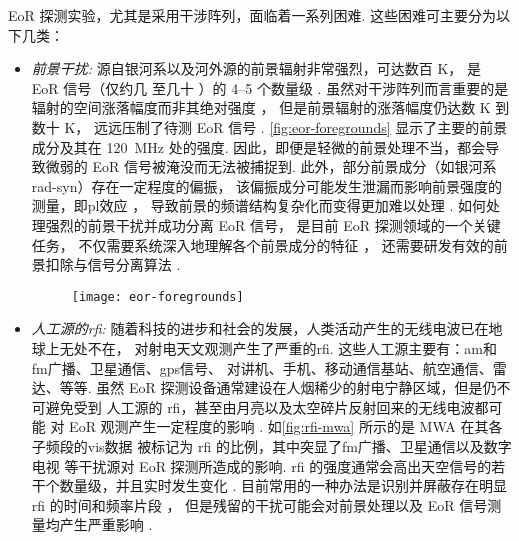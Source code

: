EoR 探测实验，尤其是采用干涉阵列，面临着一系列困难.
这些困难可主要分为以下几类：
\begin{itemize}
\item
\emph{前景干扰:}
源自银河系以及河外源的前景辐射非常强烈，可达数百 \si{\kelvin}，
是 EoR 信号（仅约几 \si{\mK} 至几十 \si{\mK}）的 \numrange{4}{5} 个数量级
\cite{morales2010}.
虽然对干涉阵列而言重要的是辐射的空间涨落幅度而非其绝对强度 \cite{braun1985}，
但是前景辐射的涨落幅度仍达数 \si{\kelvin} 到数十 \si{\kelvin}，
远远压制了待测 EoR 信号 \cite{zaroubi2013}.
\autoref{fig:eor-foregrounds} 显示了主要的前景成分及其在
\SI{120}{\MHz} 处的强度.
因此，即便是轻微的前景处理不当，都会导致微弱的 EoR 信号被淹没而无法被捕捉到.
此外，部分前景成分（如银河系\ac{rad-syn}）存在一定程度的偏振，
该偏振成分可能发生泄漏而影响前景强度的测量，即\ac{pl}效应 \cite{cotton1999}，
导致前景的频谱结构复杂化而变得更加难以处理
\cite{jelic2014,asad2015,asad2016,asad2018,gehlot2018}.
如何处理强烈的前景干扰并成功分离 EoR 信号，
是目前 EoR 探测领域的一个关键任务，
不仅需要系统深入地理解各个前景成分的特征
\cite{jelic2008,jelic2010,wang2010,liu2012,offringa2016,
  carroll2016,murray2017,procopio2017,spinelli2018}，
还需要研发有效的前景扣除与信号分离算法
\cite{wang2006,jelic2008,harker2009,liu2009fgrm,chapman2012,chapman2013,
  gu2013,wang2013,bonaldi2015,chapman2015,chapman2016,mertens2018}.

\begin{figure}[htp]
  \centering
  \texttt{[image: eor-foregrounds]}
  \label{fig:eor-foregrounds}
\end{figure}

\item
\emph{人工源的\acl{rfi}:}
随着科技的进步和社会的发展，人类活动产生的无线电波已在地球上无处不在，
对射电天文观测产生了严重的\acf{rfi}.
这些人工源主要有：\ac{am}和\ac{fm}广播、卫星通信、\ac{gps}信号、
对讲机、手机、移动通信基站、航空通信、雷达、等等.
虽然 EoR 探测设备通常建设在人烟稀少的射电宁静区域，但是仍不可避免受到
人工源的 \ac{rfi}，甚至由月亮以及太空碎片反射回来的无线电波都可能
对 EoR 观测产生一定程度的影响 \cite{mcKinley2013,tingay2013rfi}.
如\autoref{fig:rfi-mwa} 所示的是 MWA 在其各子频段的\ac{vis}数据
被标记为 \ac{rfi} 的比例，其中突显了\ac{fm}广播、卫星通信以及数字电视
等干扰源对 EoR 探测所造成的影响.
\ac{rfi} 的强度通常会高出天空信号的若干个数量级，并且实时发生变化 \cite{bentum2011}.
目前常用的一种办法是识别并屏蔽存在明显 \ac{rfi} 的时间和频率片段
\cite{fridman2001,offringa2010,offringa2012,prasad2012,akeret2017}，
但是残留的干扰可能会对前景处理以及 EoR 信号测量均产生严重影响 \cite{offringa2015}.


\end{itemize}
